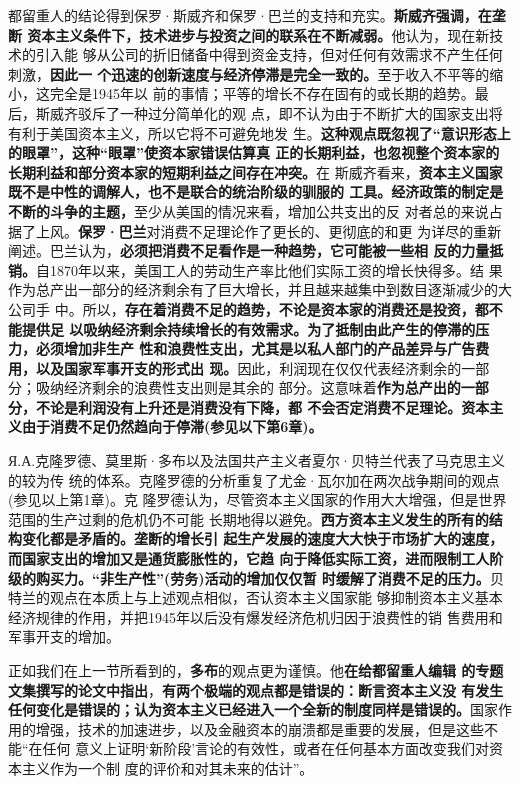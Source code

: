都留重人的结论得到保罗·斯威齐和保罗·巴兰的支持和充实。\textbf{斯威齐强调，在垄断
  资本主义条件下，技术进步与投资之间的联系在不断减弱。}他认为，现在新技术的引入能
够从公司的折旧储备中得到资金支持，但对任何有效需求不产生任何刺激，\textbf{因此一
  个迅速的创新速度与经济停滞是完全一致的。}至于收入不平等的缩小，这完全是1945年以
前的事情；平等的增长不存在固有的或长期的趋势。最后，斯威齐驳斥了一种过分简单化的观
点，即不认为由于不断扩大的国家支出将有利于美国资本主义，所以它将不可避免地发
生。\textbf{这种观点既忽视了“意识形态上的眼罩”，这种“眼罩”使资本家错误估算真
  正的长期利益，也忽视整个资本家的长期利益和部分资本家的短期利益之间存在冲突。}在
斯威齐看来，\textbf{资本主义国家既不是中性的调解人，也不是联合的统治阶级的驯服的
  工具。经济政策的制定是不断的斗争的主题，}至少从美国的情况来看，增加公共支出的反
对者总的来说占据了上风。\textbf{保罗·巴兰}对消费不足理论作了更长的、更彻底的和更
为详尽的重新阐述。巴兰认为，\textbf{必须把消费不足看作是一种趋势，它可能被一些相
  反的力量抵销。}自1870年以来，美国工人的劳动生产率比他们实际工资的增长快得多。结
果作为总产出一部分的经济剩余有了巨大增长，并且越来越集中到数目逐渐减少的大公司手
中。所以，\textbf{存在着消费不足的趋势，不论是资本家的消费还是投资，都不能提供足
  以吸纳经济剩余持续增长的有效需求。为了抵制由此产生的停滞的压力，必须增加非生产
  性和浪费性支出，尤其是以私人部门的产品差异与广告费用，以及国家军事开支的形式出
  现。}因此，利润现在仅仅代表经济剩余的一部分；吸纳经济剩余的浪费性支出则是其余的
部分。这意味着\textbf{作为总产出的一部分，不论是利润没有上升还是消费没有下降，都
  不会否定消费不足理论。资本主义由于消费不足仍然趋向于停滞(参见以下第6章)。}

Я.А.克隆罗德、莫里斯·多布以及法国共产主义者夏尔·贝特兰代表了马克思主义的较为传
统的体系。克隆罗德的分析重复了尤金·瓦尔加在两次战争期间的观点(参见以上第1章)。克
隆罗德认为，尽管资本主义国家的作用大大增强，但是世界范围的生产过剩的危机仍不可能
长期地得以避免。\textbf{西方资本主义发生的所有的结构变化都是矛盾的。垄断的增长引
  起生产发展的速度大大快于市场扩大的速度，而国家支出的增加又是通货膨胀性的，它趋
  向于降低实际工资，进而限制工人阶级的购买力。“非生产性”(劳务)活动的增加仅仅暂
  时缓解了消费不足的压力。}贝特兰的观点在本质上与上述观点相似，否认资本主义国家能
够抑制资本主义基本经济规律的作用，并把1945年以后没有爆发经济危机归因于浪费性的销
售费用和军事开支的增加。

正如我们在上一节所看到的，\textbf{多布}的观点更为谨慎。他\textbf{在给都留重人编辑
  的专题文集撰写的论文中指出}，\textbf{有两个极端的观点都是错误的：断言资本主义没
  有发生任何变化是错误的；认为资本主义已经进入一个全新的制度同样是错误的。}国家作
用的增强，技术的加速进步，以及金融资本的崩溃都是重要的发展，但是这些不能“在任何
意义上证明‘新阶段’言论的有效性，或者在任何基本方面改变我们对资本主义作为一个制
度的评价和对其未来的估计”。

